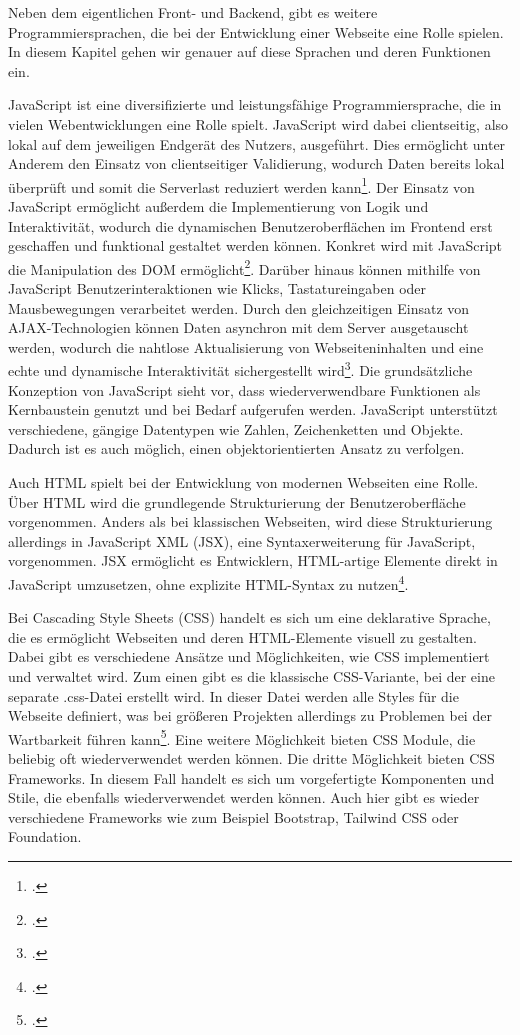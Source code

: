 Neben dem eigentlichen Front- und Backend, gibt es weitere Programmiersprachen, die bei der Entwicklung einer Webseite eine Rolle spielen. In diesem Kapitel gehen wir genauer auf diese Sprachen und deren Funktionen ein.

JavaScript ist eine diversifizierte und leistungsfähige Programmiersprache, die in vielen Webentwicklungen eine Rolle spielt. JavaScript wird dabei clientseitig, also lokal auf dem jeweiligen Endgerät des Nutzers, ausgeführt. Dies ermöglicht unter Anderem den Einsatz von clientseitiger Validierung, wodurch Daten bereits lokal überprüft und somit die Serverlast reduziert werden kann\footcite{autor_professionelles_nodate}.
Der Einsatz von JavaScript ermöglicht außerdem die Implementierung von Logik und Interaktivität, wodurch die dynamischen Benutzeroberflächen im Frontend erst geschaffen und funktional gestaltet werden können. Konkret wird mit JavaScript die Manipulation des DOM ermöglicht\footcite{autor_funktionen_nodate}.
Darüber hinaus können mithilfe von JavaScript Benutzerinteraktionen wie Klicks, Tastatureingaben oder Mausbewegungen verarbeitet werden. Durch den gleichzeitigen Einsatz von AJAX-Technologien können Daten asynchron mit dem Server ausgetauscht werden, wodurch die nahtlose Aktualisierung von Webseiteninhalten  und eine echte und dynamische Interaktivität sichergestellt wird\footcite{autor_javascript_nodate}.
Die grundsätzliche Konzeption von JavaScript sieht vor, dass wiederverwendbare Funktionen als Kernbaustein genutzt und bei Bedarf aufgerufen werden. JavaScript unterstützt verschiedene, gängige Datentypen wie Zahlen, Zeichenketten und Objekte. Dadurch ist es auch möglich, einen objektorientierten Ansatz zu verfolgen.

Auch HTML spielt bei der Entwicklung von modernen Webseiten eine Rolle. Über HTML wird die grundlegende Strukturierung der Benutzeroberfläche vorgenommen.
Anders als bei klassischen Webseiten, wird diese Strukturierung allerdings in JavaScript XML (JSX), eine Syntaxerweiterung für JavaScript, vorgenommen.
JSX ermöglicht es Entwicklern, HTML-artige Elemente direkt in JavaScript umzusetzen, ohne explizite HTML-Syntax zu nutzen\footcite{autor_react_nodate-1}.

Bei Cascading Style Sheets (CSS) handelt es sich um eine deklarative Sprache, die es ermöglicht Webseiten und deren HTML-Elemente visuell zu gestalten. Dabei gibt es verschiedene Ansätze und Möglichkeiten, wie CSS implementiert und verwaltet wird.
Zum einen gibt es die klassische CSS-Variante, bei der eine separate .css-Datei erstellt wird. In dieser Datei werden alle Styles für die Webseite definiert, was bei größeren Projekten allerdings zu Problemen bei der Wartbarkeit führen kann\footcite{autor_welche_2019}.
Eine weitere Möglichkeit bieten CSS Module, die beliebig oft wiederverwendet werden können.
Die dritte Möglichkeit bieten CSS Frameworks. In diesem Fall handelt es sich um vorgefertigte Komponenten und Stile, die ebenfalls wiederverwendet werden können. Auch hier gibt es wieder verschiedene Frameworks wie zum Beispiel Bootstrap, Tailwind CSS oder Foundation.